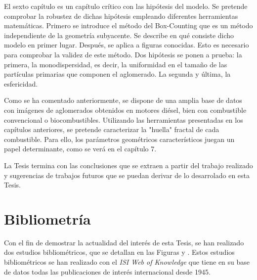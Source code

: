 \par El sexto capítulo es un capítulo crítico con las hipótesis del modelo. Se pretende comprobar la robustez de dichas hipótesis empleando diferentes herramientas matemáticas. Primero se introduce el método del Box-Counting que es un método independiente de la geometría subyacente. Se describe en qué consiste dicho modelo en primer lugar. Después, se aplica a figuras conocidas. Esto es necesario para comprobar la validez de este método. Dos hipótesis se ponen a prueba: la primera, la monodispersidad, es decir, la uniformidad en el tamaño de las partículas primarias que componen el aglomerado. La segunda y última, la esfericidad.

\par Como se ha comentado anteriormente, se dispone de una amplia base de datos con imágenes de aglomerados obtenidos en motores diésel, bien con combustible convencional o biocombustibles. Utilizando las herramientas presentadas en los capítulos anteriores, se pretende caracterizar la "huella" fractal de cada combustible. Para ello, los parámetros geométricos característicos juegan un papel determinante, como se verá en el capítulo 7.

\par La Tesis termina con las conclusiones que se extraen a partir del trabajo realizado y sugerencias de trabajos futuros que se puedan derivar de lo desarrolado en esta Tesis.


\section{Bibliometría}\label{sec:Bibliometria}

\par Con el fin de demostrar la actualidad del interés de esta Tesis, se han realizado dos estudios bibliométricos, que se detallan en las Figuras y . Estos estudios bibliométricos se han realizado con el \emph{ISI Web of Knowledge} que tiene en su base de datos todas las publicaciones de interés internacional desde 1945.

\newpage
	
